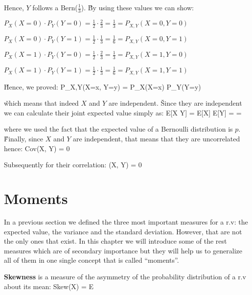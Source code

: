 Hence, $Y$ follows a Bern\Big($\frac{1}{3}$\Big). \v

By using these values we can show:
\bit
\item $P_{X}(X=0) \cdot P_{Y}(Y=0) = \frac{1}{2} \cdot \frac{2}{3} = \frac{1}{3} = P_{X,Y}(X=0, Y=0)$
\item $P_{X}(X=0) \cdot P_{Y}(Y=1) = \frac{1}{2} \cdot \frac{1}{3} = \frac{1}{6} = P_{X,Y}(X=0, Y=1)$
\item $P_{X}(X=1) \cdot P_{Y}(Y=0) = \frac{1}{2} \cdot \frac{2}{3} = \frac{1}{3} = P_{X,Y}(X=1, Y=0)$
\item $P_{X}(X=1) \cdot P_{Y}(Y=1) = \frac{1}{2} \cdot \frac{1}{3} = \frac{1}{6} = P_{X,Y}(X=1, Y=1)$
\eit

\v

Hence, we proved:
\bse
P_{X,Y}(X=x, Y=y) = P_{X}(X=x) \cdot P_{Y}(Y=y)
\ese

\v

which means that indeed $X$ and $Y$ are independent. \v

Since they are independent we can calculate their joint expected value simply as:
\bse
E[X \cdot Y] = E[X] \cdot E[Y] =  \cdot {} = 
\ese

where we used the fact that the expected value of a Bernoulli distribution is $p$. \v

Finally, since $X$ and $Y$ are independent, that means that they are uncorrelated hence:
\bse
Cov(X, Y) = 0
\ese

Subsequently for their correlation:
\bse
\rho(X, Y) = 0
\ese

\section{Moments}

In a previous section we defined the three most important measures for a r.v: the expected value, the variance and
the standard deviation. However, that are not the only ones that exist. In this chapter we will introduce some of the
rest measures which are of secondary importance but they will help us to generalize all of them in one single concept
that is called ``moments''.

\bd[Skewness]
\textbf{Skewness} is a measure of the asymmetry of the probability distribution of a r.v about its mean:
\bse
Skew(X) = E 
\ese
\ed

\vspace{10pt}

